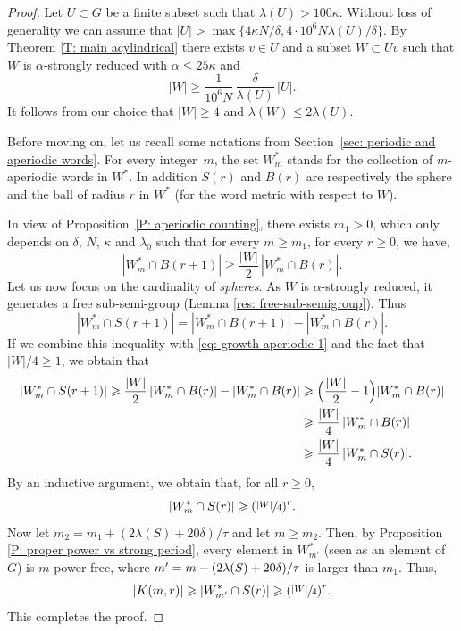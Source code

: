 \begin{proof} Let $U\subset G$ be a finite subset such that $\lambda(U)>100 \kappa$.
Without loss of generality we can assume that $|U| > \max\{4\kappa N/\delta, 4\cdot 10^6 N \lambda(U)/\delta\}$.
By Theorem \ref{T: main acylindrical} there exists $v \in U$ and a subset $W \subset Uv$ such that $W$ is $\alpha$-strongly reduced with $\alpha \leq 25\kappa$ and
\begin{equation*}
|W| \geq \frac 1{10^6N}\,\frac \delta{\lambda(U)}\, |U|.
\end{equation*}
It follows from our choice that $|W| \geq 4$ and $\lambda(W) \leq 2 \lambda(U)$.

Before moving on, let us recall some notations from Section~\ref{sec: periodic and aperiodic words}.
For every integer~$m$, the set $W^*_m$ stands for the collection of $m$-aperiodic words in $W^*$.
In addition $S(r)$ and $B(r)$ are respectively the sphere and the ball of radius $r$ in $W^*$ (for the word metric with respect to $W$).

In view of Proposition~\ref{P: aperiodic counting}, there exists $m_1 > 0$, which only depends on $\delta$, $N$, $\kappa$ and $\lambda_0$ such that for every $m \geq m_1$, for every $r \geq 0$, we have,
\begin{equation}
|W^*_m \cap B(r+1)| \geqslant \frac{|W|}2\, |W^*_m \cap B(r)|. \label{eq: growth aperiodic 1}
\end{equation}
Let us now focus on the cardinality of \emph{spheres}.
As $W$ is $\alpha$-strongly reduced, it generates a free sub-semi-group (Lemma \ref{res: free-sub-semigroup}). Thus
\[
|W_m^* \cap S(r+1)| = |W^*_m\cap B(r+1)| -|W_m^* \cap B(r)|.
\]
If we combine this inequality with \eqref{eq: growth aperiodic 1} and the fact that $|W|/4\geqslant 1$, we obtain that
\begin{align*}
|W^*_m \cap S(r+1)|
\geqslant \frac{|W|}2\, |W^*_m \cap B(r)| -|W_m^* \cap B(r)|
&\geqslant \Bigl(\frac{|W|}{2} -1\Bigr) |W^*_m \cap B(r)| \\
& \geqslant \frac{|W|}4\, |W^*_m \cap B(r)| \\
& \geqslant \frac{|W|}4\, |W^*_m \cap S(r)| .
\end{align*}
By an inductive argument, we obtain that, for all $r\geqslant 0$,
\begin{equation*}
|W^*_m \cap S(r)| \geqslant(\sfrac{|W|}{4})^r.
\end{equation*}
Now let $m_2=m_1+(2\lambda(S) + 20\delta)/\tau$ and let $m\geqslant m_2$.
Then, by Proposition \ref{P: proper power vs strong period}, every element in $W^*_{m'}$ (seen as an element of $G$) is $m$-power-free, where $m'=m-(2\lambda(S) +\nobreak 20\delta)/\tau$ is larger than $m_1$.
Thus,
\begin{equation*}
|K(m,r)|\geqslant |W^*_{m'} \cap S(r)| \geqslant(\sfrac{|W|}{4})^{r}.
\end{equation*}
This completes the proof.
\end{proof}

